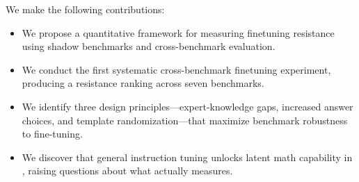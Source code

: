 We make the following contributions:
\begin{itemize}[leftmargin=*,itemsep=0pt,topsep=0pt]
    \item We propose a quantitative framework for measuring finetuning resistance using shadow benchmarks and cross-benchmark evaluation.
    \item We conduct the first systematic cross-benchmark finetuning experiment, producing a resistance ranking across seven benchmarks.
    \item We identify three design principles---expert-knowledge gaps, increased answer choices, and template randomization---that maximize benchmark robustness to fine-tuning.
    \item We discover that general instruction tuning unlocks latent math capability in \qwen, raising questions about what \gsmk actually measures.
\end{itemize}
